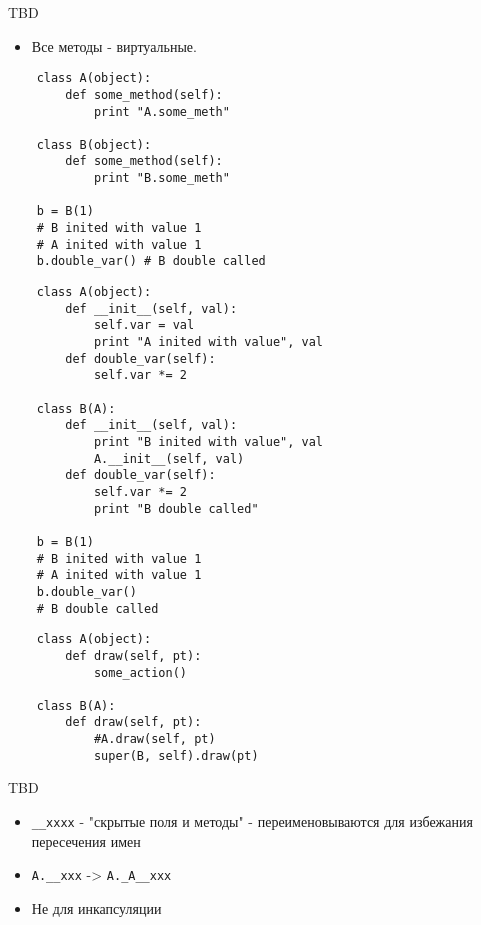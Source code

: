 \documentclass{article}
\begin{document}
TBD
\newpage

\begin{itemize}
	\item Все методы - виртуальные.
\end{itemize}
{
\Large
\vspace{15pt}
\begin{lstlisting}
	class A(object):
		def some_method(self):
			print "A.some_meth"

	class B(object):
		def some_method(self):
			print "B.some_meth"

	b = B(1) 
	# B inited with value 1
	# A inited with value 1
	b.double_var() # B double called
\end{lstlisting}
}
\newpage

{
\Large
\vspace{15pt}
\begin{lstlisting}
	class A(object):
		def __init__(self, val):
			self.var = val
			print "A inited with value", val
		def double_var(self):
			self.var *= 2

	class B(A):
		def __init__(self, val):
			print "B inited with value", val
			A.__init__(self, val)
		def double_var(self):
			self.var *= 2
			print "B double called"

	b = B(1) 
	# B inited with value 1
	# A inited with value 1
	b.double_var() 
	# B double called
\end{lstlisting}
}
\newpage

\begin{lstlisting}
	class A(object):
	    def draw(self, pt):
	        some_action()

	class B(A):
	    def draw(self, pt):
	    	#A.draw(self, pt)
	        super(B, self).draw(pt)
\end{lstlisting}
\newpage

TBD
\newpage

\begin{itemize}
	\item \lstinline!__xxxx! - "скрытые поля и методы" 
		- переименовываются для избежания пересечения имен
	\item \lstinline!A.__xxx! -> \lstinline!A._A__xxx!
	\item Не для инкапсуляции
\end{itemize}
\newpage
\end{document}
